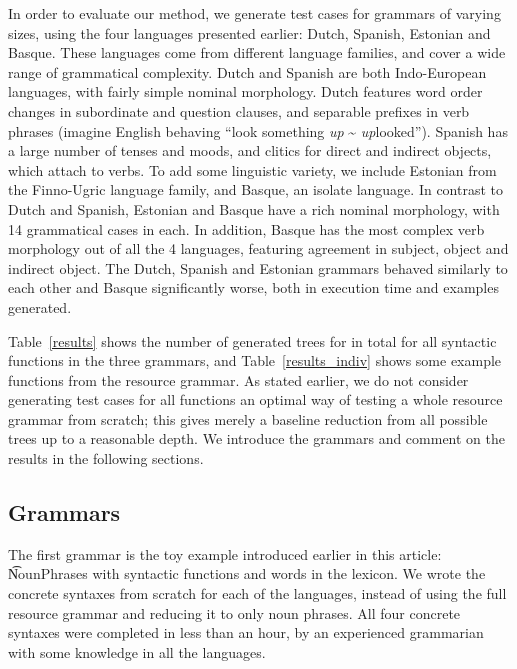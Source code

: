 In order to evaluate our method, we generate test cases for grammars
of varying sizes, using the four languages presented earlier: Dutch, Spanish,
Estonian and Basque. These languages come from different language
families, and cover a wide range of grammatical complexity. Dutch and
Spanish are both Indo-European languages, with fairly simple nominal
morphology. Dutch features word order changes in subordinate and
question clauses, and separable prefixes in verb phrases (imagine
English behaving ``look something \emph{up} \~{} {\it up}looked'').
Spanish has a large number of tenses and moods, and clitics for direct
and indirect objects, which attach to verbs.  To add some linguistic
variety, we include Estonian from the Finno-Ugric language family, and
Basque, an isolate language.  In contrast to Dutch and Spanish,
Estonian and Basque have a rich nominal morphology, with 14
grammatical cases in each. In addition, Basque has the most complex
verb morphology out of all the 4 languages, featuring agreement in
subject, object and indirect object.
The Dutch, Spanish and Estonian grammars behaved similarly to each other
and Basque significantly worse, both in execution time and examples
generated.

Table~\ref{results} shows the number of generated trees for
in total for all syntactic functions in the three grammars, and
Table~\ref{results_indiv} shows some example functions from the resource grammar.
As stated earlier, we do not consider generating test cases for all
functions an optimal way of testing a whole resource grammar from scratch;
this gives merely a baseline reduction from all possible trees up to a
reasonable depth. We introduce the grammars and comment on the results
in the following sections.

\subsection{Grammars}

The first grammar is the toy example introduced earlier in this
article: \t{NounPhrases} with \numOfFun syntactic functions and
\numOfLex words in the lexicon. We wrote the concrete syntaxes from
scratch for each of the languages, instead of using the full resource
grammar and reducing it to only noun phrases. All four concrete
syntaxes were completed in less than an hour, by an experienced
grammarian with some knowledge in all the languages.

